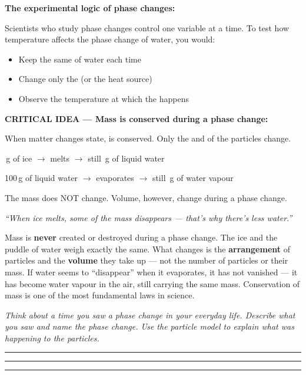 \documentclass[11pt, a4paper]{article}
\newcommand{\blank}[1]{\underline{\hspace{#1}}}
\newcommand{\answerline}{\par\vspace{0.45cm}\noindent\rule{\linewidth}{0.4pt}\par\vspace{0.1cm}}
\begin{document}
\medskip
\textbf{The experimental logic of phase changes:}

Scientists who study phase changes control one variable at a time. To test how temperature affects the phase change of water, you would:
\begin{itemize}[noitemsep, topsep=2pt]
  \item Keep the same \blank{3cm} of water each time
  \item Change only the \blank{3cm} (or the heat source)
  \item Observe the temperature at which the \blank{3cm} happens
\end{itemize}

\medskip
\textbf{CRITICAL IDEA --- Mass is conserved during a phase change:}

When matter changes state, \blank{2cm} is conserved. Only the \blank{2.5cm} and \blank{2.5cm} of the particles change.

\,g of ice $\rightarrow$ melts $\rightarrow$ still \blank{1.5cm}\,g of liquid water

100\,g of liquid water $\rightarrow$ evaporates $\rightarrow$ still \blank{1.5cm}\,g of water vapour

\medskip
The mass does NOT change. Volume, however, \blank{2cm} change during a phase change.

\begin{tcolorbox}[misconc]
\textit{``When ice melts, some of the mass disappears --- that's why there's less water.''}

\medskip
Mass is \textbf{never} created or destroyed during a phase change. The ice and the puddle of water weigh exactly the same. What changes is the \textbf{arrangement} of particles and the \textbf{volume} they take up --- not the number of particles or their mass. If water seems to ``disappear'' when it evaporates, it has not vanished --- it has become water vapour in the air, still carrying the same mass. Conservation of mass is one of the most fundamental laws in science.
\end{tcolorbox}

\begin{tcolorbox}[connection]
\small\textit{Think about a time you saw a phase change in your everyday life. Describe what you saw and name the phase change. Use the particle model to explain what was happening to the particles.}
\answerline\answerline\answerline
\end{tcolorbox}
\end{document}

